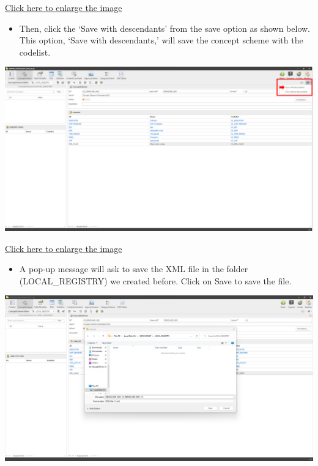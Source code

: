 \documentclass[
]{book}
\providecommand{\tightlist}{%
  \setlength{\itemsep}{0pt}\setlength{\parskip}{0pt}}
\begin{document}
\href{images/image281.png}{Click here to enlarge the image}

\begin{itemize}
\tightlist
\item
  Then, click the `Save with descendants' from the save option as shown below. This option, `Save with descendants,' will save the concept scheme with the codelist.
\end{itemize}

\begin{center}\includegraphics[width=1\linewidth]{./images/image282} \end{center}

\href{images/image282.png}{Click here to enlarge the image}

\begin{itemize}
\tightlist
\item
  A pop-up message will ask to save the XML file in the folder (LOCAL\_REGISTRY) we created before. Click on Save to save the file.
\end{itemize}

\begin{center}\includegraphics[width=1\linewidth]{./images/image283} \end{center}
\end{document}
